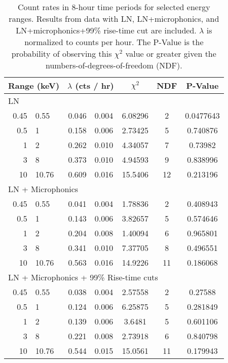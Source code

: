 			\begin{table}
				\centering
				\begin{tabular}{r@{$~\to~$}l r@{$~\pm~$}l  c  c  c} 
					\toprule 				
					\multicolumn{2}{c}{Range (keV)} & \multicolumn{2}{c}{$\lambda$ (cts / hr)} & $\chi^2$ & NDF & P-Value \\
					\midrule
					\multicolumn{7}{l}{LN} \\
					\midrule
					0.45 & 0.55 & 0.046 & 0.004 & 6.08296 & 2 & 0.0477643 \\
					0.5 & 1 & 0.158 & 0.006 & 2.73425 & 5 & 0.740876 \\
					1 & 2 & 0.262 & 0.010 & 4.34057 & 7 & 0.73982 \\
					3 & 8 & 0.373 & 0.010 & 4.94593 & 9 & 0.838996 \\
					10 & 10.76 & 0.609 & 0.016 & 15.5406 & 12 & 0.213196 \\
					\hline
					\multicolumn{7}{l}{LN + Microphonics} \\
					\hline
					0.45 & 0.55 & 0.041 & 0.004 & 1.78836 & 2 & 0.408943 \\
					0.5 & 1 & 0.143 & 0.006 & 3.82657 & 5 & 0.574646 \\
					1 & 2 & 0.204 & 0.008 & 1.40094 & 6 & 0.965801 \\
					3 & 8 & 0.341 & 0.010 & 7.37705 & 8 & 0.496551 \\
					10 & 10.76 & 0.563 & 0.016 & 14.9226 & 11 & 0.186068 \\
					\hline					
					\multicolumn{7}{l}{LN + Microphonics + 99\% Rise-time cuts} \\
					\hline
					0.45 & 0.55 & 0.038 & 0.004 & 2.57558 & 2 & 0.27588 \\
					0.5 & 1 & 0.124 & 0.006 & 6.25875 & 5 & 0.281849 \\
					1 & 2 & 0.139 & 0.006 & 3.6481 & 5 & 0.601106 \\
					3 & 8 & 0.221 & 0.008 & 2.73918 & 6 & 0.840798 \\
					10 & 10.76 & 0.544 & 0.015 & 15.0561 & 11 & 0.179943 \\
					\bottomrule
				\end{tabular}
				\caption[Count rates in 8-hour time periods for selected energy ranges]
				{Count rates in 8-hour time periods for selected energy ranges.  Results from data with LN, LN+microphonics, and LN+microphonics+99\% 
				rise-time cut are included.  $\lambda$ is normalized to counts per hour.  The P-Value is the probability of observing this $\chi^{2}$ value or greater
				given the numbers-of-degrees-of-freedom (NDF).}
				\label{tab:BeGeFitRates}
			\end{table}

